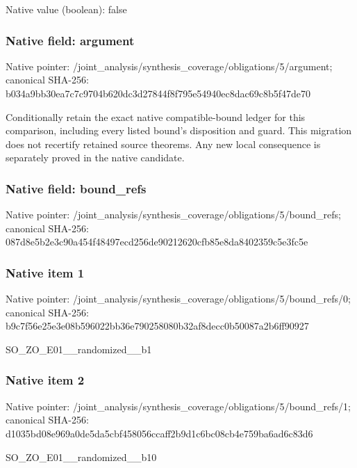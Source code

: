 \documentclass[10pt,a4paper]{article}
\begin{document}
Native value (boolean): false

\subsubsection{Native field: argument}
Native pointer: /joint\_\allowbreak{}analysis/synthesis\_\allowbreak{}coverage/obligations/5/argument; canonical SHA-256: b034a9bb30ea7c7c9704b620dc3d27844f8f795e54940ec8dac69c8b5f47de70

\begingroup\raggedright\sloppy Conditionally retain the exact native compatible-bound ledger for this comparison,\allowbreak{} including every listed bound's disposition and guard. This migration does not recertify retained source theorems. Any new local consequence is separately proved in the native candidate.\par\endgroup

\subsubsection{Native field: bound\_\allowbreak{}refs}
Native pointer: /joint\_\allowbreak{}analysis/synthesis\_\allowbreak{}coverage/obligations/5/bound\_\allowbreak{}refs; canonical SHA-256: 087d8e5b2e3c90a454f48497ecd256de90212620cfb85e8da8402359c5e3fc5e

\subsubsection{Native item 1}
Native pointer: /joint\_\allowbreak{}analysis/synthesis\_\allowbreak{}coverage/obligations/5/bound\_\allowbreak{}refs/0; canonical SHA-256: b9c7f56e25e3e08b596022bb36e790258080b32af8decc0b50087a2b6ff90927

\begingroup\raggedright\sloppy SO\_\allowbreak{}ZO\_\allowbreak{}E01\_\allowbreak{}\_\allowbreak{}randomized\_\allowbreak{}\_\allowbreak{}b1\par\endgroup

\subsubsection{Native item 2}
Native pointer: /joint\_\allowbreak{}analysis/synthesis\_\allowbreak{}coverage/obligations/5/bound\_\allowbreak{}refs/1; canonical SHA-256: d1035bd08e969a0de5da5cbf458056ccaff2b9d1c6bc08cb4e759ba6ad6c83d6

\begingroup\raggedright\sloppy SO\_\allowbreak{}ZO\_\allowbreak{}E01\_\allowbreak{}\_\allowbreak{}randomized\_\allowbreak{}\_\allowbreak{}b10\par\endgroup
\end{document}
